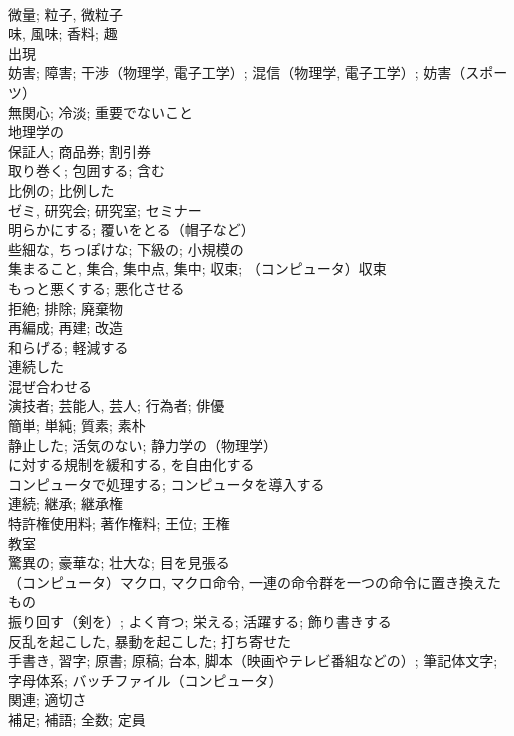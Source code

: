 \documentclass[8pt]{extreport}
\begin{document}
\begin{CJK}{UTF8}{min}
\\	微量; 粒子, 微粒子	
\\	味, 風味; 香料; 趣	
\\	出現	
\\	妨害; 障害; 干渉（物理学, 電子工学）; 混信（物理学, 電子工学）; 妨害（スポーツ）	
\\	無関心; 冷淡; 重要でないこと	
\\	地理学の	
\\	保証人; 商品券; 割引券	
\\	取り巻く; 包囲する; 含む	
\\	比例の; 比例した	
\\	ゼミ, 研究会; 研究室; セミナー	
\\	明らかにする; 覆いをとる（帽子など）	
\\	些細な, ちっぽけな; 下級の; 小規模の	
\\	集まること, 集合, 集中点, 集中; 収束; （コンピュータ）収束	
\\	もっと悪くする; 悪化させる	
\\	拒絶; 排除; 廃棄物	
\\	再編成; 再建; 改造
\\	和らげる; 軽減する	
\\	連続した	
\\	混ぜ合わせる	
\\	演技者; 芸能人, 芸人; 行為者; 俳優	
\\	簡単; 単純; 質素; 素朴	
\\	静止した; 活気のない; 静力学の（物理学）	
\\	に対する規制を緩和する, を自由化する	
\\	コンピュータで処理する; コンピュータを導入する	
\\	連続; 継承; 継承権	
\\	特許権使用料; 著作権料; 王位; 王権	
\\	教室	
\\	驚異の; 豪華な; 壮大な; 目を見張る	
\\	（コンピュータ）マクロ, マクロ命令, 一連の命令群を一つの命令に置き換えたもの	
\\	振り回す（剣を）; よく育つ; 栄える; 活躍する; 飾り書きする	
\\	反乱を起こした, 暴動を起こした; 打ち寄せた	
\\	手書き, 習字; 原書; 原稿; 台本, 脚本（映画やテレビ番組などの）; 筆記体文字; 字母体系; バッチファイル（コンピュータ）	
\\	関連; 適切さ	
\\	補足; 補語; 全数; 定員	

\end{CJK}
\end{document}
